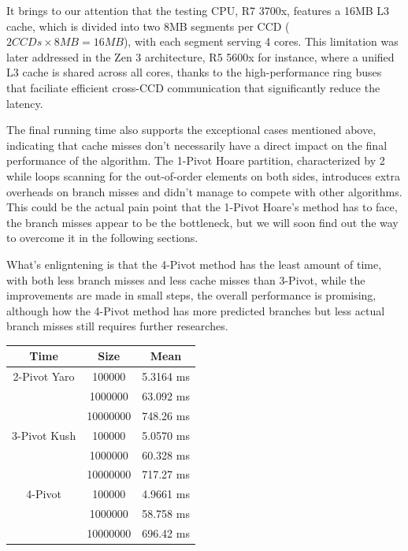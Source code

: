 \documentclass{article}
\begin{document}
It brings to our attention that the testing CPU, R7 3700x, features a 16MB L3 cache, which is divided into two 8MB segments per CCD ($2 CCDs \times 8MB = 16MB$), with each segment serving 4 cores.
This limitation was later addressed in the Zen 3 architecture, R5 5600x for instance, where a unified L3 cache is shared across all cores, thanks to the high-performance ring buses that faciliate efficient cross-CCD communication that significantly reduce the latency.

The final running time also supports the exceptional cases mentioned above, indicating that cache misses don't necessarily have a direct impact on the final performance of the algorithm.
The 1-Pivot Hoare partition, characterized by 2 while loops scanning for the out-of-order elements on both sides, introduces extra overheads on branch misses and didn't manage to compete with other algorithms.
This could be the actual pain point that the 1-Pivot Hoare's method has to face, the branch misses appear to be the bottleneck, but we will soon find out the way to overcome it in the following sections.

What's enligntening is that the 4-Pivot method has the least amount of time, with both less branch misses and less cache misses than 3-Pivot, while the improvements are made in small steps, the overall performance is promising,
although how the 4-Pivot method has more predicted branches but less actual branch misses still requires further researches.

\begin{center}
\small
\begin{tabular}{ |c c | c | }
    \hline
    Time            & Size     & Mean         \\
    \hline
    2-Pivot Yaro    & 100000   & 5.3164 ms    \\
                    & 1000000  & 63.092 ms    \\
                    & 10000000 & 748.26 ms    \\

    \hline
    3-Pivot Kush    & 100000   & 5.0570 ms    \\
                    & 1000000  & 60.328 ms    \\
                    & 10000000 & 717.27 ms    \\
    \hline
    4-Pivot         & 100000   & 4.9661 ms    \\
                    & 1000000  & 58.758 ms    \\
                    & 10000000 & 696.42 ms    \\
    \hline
\end{tabular}
\end{center}
\end{document}
